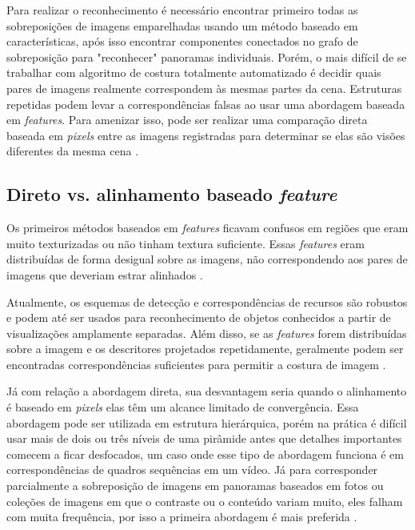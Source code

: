 \documentclass{article}
\begin{document}
Para realizar o reconhecimento é necessário encontrar primeiro todas as sobreposições de imagens emparelhadas usando um método baseado em características, após isso encontrar componentes conectados no grafo de sobreposição para "reconhecer" panoramas individuais. Porém, o mais difícil de se trabalhar com algoritmo de costura totalmente automatizado é decidir quais pares de imagens realmente correspondem às mesmas partes da cena. Estruturas repetidas podem levar a correspondências falsas ao usar uma abordagem baseada em \textit{features}. Para amenizar isso, pode ser realizar uma comparação direta baseada em \textit{pixels} entre as imagens registradas para determinar se elas são visões diferentes da mesma cena \cite{szeliski:2010}.

\subsection{Direto vs. alinhamento baseado \textit{feature}}
Os primeiros métodos baseados em \textit{features} ficavam confusos em regiões que eram muito texturizadas ou não tinham textura suficiente. Essas \textit{features} eram distribuídas de forma desigual sobre as imagens, não correspondendo aos pares de imagens que deveriam estrar alinhados \cite{szeliski:2010}.

Atualmente, os esquemas de detecção e correspondências de recursos são robustos e podem até ser usados para reconhecimento de objetos conhecidos a partir de visualizações amplamente separadas. Além disso, se as \textit{features} forem distribuídas sobre a imagem e os descritores projetados repetidamente, geralmente podem ser encontradas correspondências suficientes para permitir a costura de imagem \cite{szeliski:2010}.

Já com relação a abordagem direta, sua desvantagem seria quando o alinhamento é baseado em \textit{pixels} elas têm um alcance limitado de convergência. Essa abordagem pode ser utilizada em estrutura hierárquica, porém na prática é difícil usar mais de dois ou três níveis de uma pirâmide antes que detalhes importantes comecem a ficar desfocados, um caso onde esse tipo de abordagem funciona é em correspondências de quadros sequências em um vídeo. Já para corresponder parcialmente a sobreposição de imagens em panoramas baseados em fotos ou coleções de imagens em que o contraste ou o conteúdo variam muito, eles falham com muita frequência, por isso a primeira abordagem é mais preferida \cite{szeliski:2010}.
\end{document}
